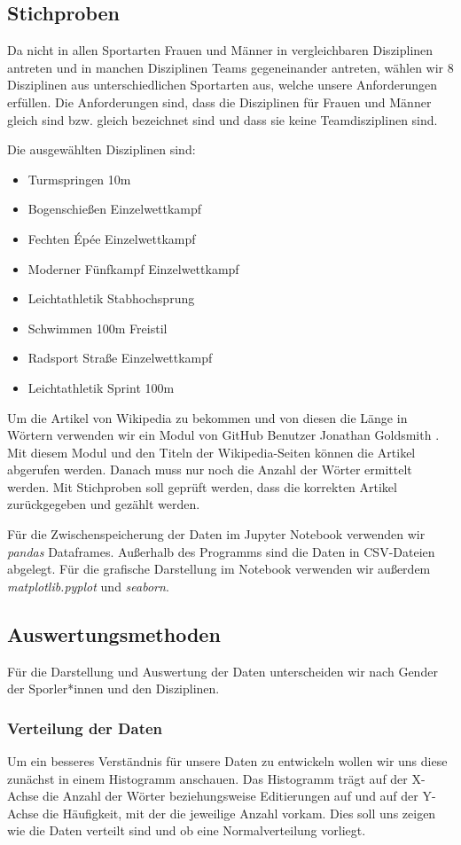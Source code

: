 \documentclass[11pt]{article}
\begin{document}
\subsection{Stichproben}
Da nicht in allen Sportarten Frauen und Männer in vergleichbaren Disziplinen antreten und in manchen Disziplinen Teams gegeneinander antreten, wählen wir 8 Disziplinen aus unterschiedlichen Sportarten aus, welche unsere Anforderungen erfüllen. Die Anforderungen sind, dass die Disziplinen für Frauen und Männer gleich sind bzw. gleich bezeichnet sind und dass sie keine Teamdisziplinen sind.

Die ausgewählten Disziplinen sind:
\begin{itemize}
\item Turmspringen 10m
\item Bogenschießen Einzelwettkampf
\item Fechten Épée Einzelwettkampf
\item Moderner Fünfkampf Einzelwettkampf
\item Leichtathletik Stabhochsprung
\item Schwimmen 100m Freistil
\item Radsport Straße Einzelwettkampf
\item Leichtathletik Sprint 100m
\end{itemize}

Um die Artikel von Wikipedia zu bekommen und von diesen die Länge in Wörtern verwenden wir ein Modul von GitHub Benutzer Jonathan Goldsmith \parencite{goldsmith}. Mit diesem Modul und den Titeln der Wikipedia-Seiten können die Artikel abgerufen werden. Danach muss nur noch die Anzahl der Wörter ermittelt werden. Mit Stichproben soll geprüft werden, dass die korrekten Artikel zurückgegeben und gezählt werden.

Für die Zwischenspeicherung der Daten im Jupyter Notebook verwenden wir \textit{pandas} Dataframes. Außerhalb des Programms sind die Daten in CSV-Dateien abgelegt. Für die grafische Darstellung im Notebook verwenden wir außerdem \textit{matplotlib.pyplot} und \textit{seaborn}.

\subsection{Auswertungsmethoden}
Für die Darstellung und Auswertung der Daten unterscheiden wir nach Gender der Sporler*innen und den Disziplinen.

\subsubsection{Verteilung der Daten}
Um ein besseres Verständnis für unsere Daten zu entwickeln wollen wir uns diese zunächst in einem Histogramm anschauen. Das Histogramm trägt auf der X-Achse die Anzahl der Wörter beziehungsweise Editierungen auf und auf der Y-Achse die Häufigkeit, mit der die jeweilige Anzahl vorkam. Dies soll uns zeigen wie die Daten verteilt sind und ob eine Normalverteilung vorliegt.
\end{document}
